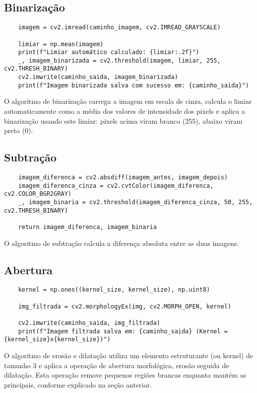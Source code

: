 \documentclass{article}
\begin{document}
\subsection{Binarização}

\begin{verbatim}
    imagem = cv2.imread(caminho_imagem, cv2.IMREAD_GRAYSCALE)

    limiar = np.mean(imagem)
    print(f"Limiar automático calculado: {limiar:.2f}")
    _, imagem_binarizada = cv2.threshold(imagem, limiar, 255, cv2.THRESH_BINARY)
    cv2.imwrite(caminho_saida, imagem_binarizada)
    print(f"Imagem binarizada salva com sucesso em: {caminho_saida}")
\end{verbatim}

O algoritmo de binarização carrega a imagem em escala de cinza, calcula o limiar automaticamente como a média dos valores de intensidade dos pixels e aplica a binarização usando este limiar: pixels acima viram branco (255), abaixo viram preto (0).

\subsection{Subtração}

\begin{verbatim}
    imagem_diferenca = cv2.absdiff(imagem_antes, imagem_depois)
    imagem_diferenca_cinza = cv2.cvtColor(imagem_diferenca, cv2.COLOR_BGR2GRAY)
    _, imagem_binaria = cv2.threshold(imagem_diferenca_cinza, 50, 255, cv2.THRESH_BINARY)

    return imagem_diferenca, imagem_binaria
\end{verbatim}

O algoritmo de subtração calcula a diferença absoluta entre as duas imagens.

\subsection{Abertura}

\begin{verbatim}
    kernel = np.ones((kernel_size, kernel_size), np.uint8)

    img_filtrada = cv2.morphologyEx(img, cv2.MORPH_OPEN, kernel)

    cv2.imwrite(caminho_saida, img_filtrada)
    print(f"Imagem filtrada salva em: {caminho_saida} (Kernel = {kernel_size}x{kernel_size})")
\end{verbatim}

O algoritmo de erosão e dilatação utiliza um elemento estruturante (ou kernel) de tamanho 3 e aplica a operação de abertura morfológica, erosão seguida de dilatação. Esta operação remove pequenos regiões brancas enquanto mantém as principais, conforme explicado na seção anterior.
\end{document}
